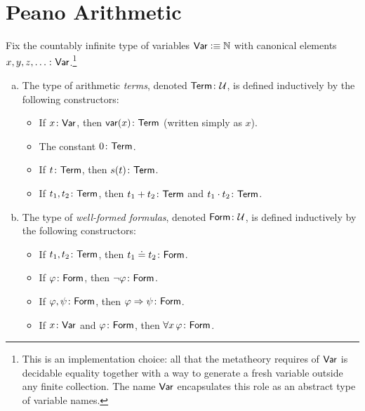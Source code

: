 \section{Peano Arithmetic}
\begin{defn}[Syntax]
    Fix the countably infinite type of variables $\mathsf{Var}\mathrel{\vcentcolon}\equiv\mathbb{N}$ with canonical elements $x,y,z,\dots\colon\fun{Var}$.\footnote{This is an implementation choice: all that the metatheory requires of $\mathsf{Var}$ is decidable equality together with a way to generate a fresh variable outside any finite collection. The name $\mathsf{Var}$ encapsulates this role as an abstract type of variable names.}
    \begin{enumerate}[a),font=\upshape]
        \item The type of arithmetic \textsl{terms}, denoted $\fun{Term}\colon\univ$, is defined inductively by the following constructors:
        \begin{itemize}
            \item If $x\colon\fun{Var}$, then $\fun{var}(x)\colon\fun{Term}$ (written simply as $x$).
            
            \item The constant $0\colon\fun{Term}$.
            
            \item If $t\colon\fun{Term}$, then $s(t)\colon\fun{Term}$.
            
            \item If $t_1,t_2\colon\fun{Term}$, then $t_1+t_2\colon\fun{Term}$ and $t_1\cdot t_2\colon\fun{Term}$.
        \end{itemize}
        
        \item The type of \textsl{well-formed formulas}, denoted $\fun{Form}\colon\univ$, is defined inductively by the following constructors:
        \begin{itemize}
            \item If $t_1,t_2\colon\fun{Term}$, then $t_1\doteq t_2\colon\fun{Form}$.
            
            \item If $\varphi\colon\fun{Form}$, then $\neg\varphi\colon\fun{Form}$.
            
            \item If $\varphi,\psi\colon\fun{Form}$, then $\varphi\imp\psi\colon\fun{Form}$.
            
            \item If $x\colon\fun{Var}$ and $\varphi\colon\fun{Form}$, then $\forall x\,\varphi\colon\fun{Form}$.
        \end{itemize}
        

\end{enumerate}
\end{defn}
